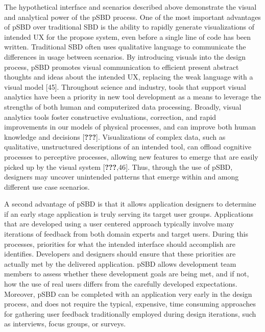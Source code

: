 \documentclass[]{article}
\begin{document}
The hypothetical interface and scenarios described above demonstrate the
visual and analytical power of the pSBD process. One of the most
important advantages of pSBD over traditional SBD is the ability to
rapidly generate visualizations of intended UX for the propose system,
even before a single line of code has been written. Traditional SBD
often uses qualitative language to communicate the differences in usage
between scenarios. By introducing visuals into the design process, pSBD
promotes visual communication to efficient present abstract thoughts and
ideas about the intended UX, replacing the weak language with a visual
model {[}45{]}. Throughout science and industry, tools that support
visual analytics have been a priority in new tool development as a means
to leverage the strengths of both human and computerized data
processing. Broadly, visual analytics tools foster constructive
evaluations, correction, and rapid improvements in our models of
physical processes, and can improve both human knowledge and decisions
{[}{\textbf{???}}{]}. Visualizations of complex data, such as
qualitative, unstructured descriptions of an intended tool, can offload
cognitive processes to perceptive processes, allowing new features to
emerge that are easily picked up by the visual system
{[}{\textbf{???}},46{]}. Thus, through the use of pSBD, designers may
uncover unintended patterns that emerge within and among different use
case scenarios.

A second advantage of pSBD is that it allows application designers to
determine if an early stage application is truly serving its target user
groups. Applications that are developed using a user centered approach
typically involve many iterations of feedback from both domain experts
and target users. During this processes, priorities for what the
intended interface should accomplish are identifies. Developers and
designers should ensure that these priorities are actually met by the
delivered application. pSBD allows development team members to assess
whether these development goals are being met, and if not, how the use
of real users differs from the carefully developed expectations.
Moreover, pSBD can be completed with an application very early in the
design process, and does not require the typical, expensive, time
consuming approaches for gathering user feedback traditionally employed
during design iterations, such as interviews, focus groups, or surveys.
\end{document}
